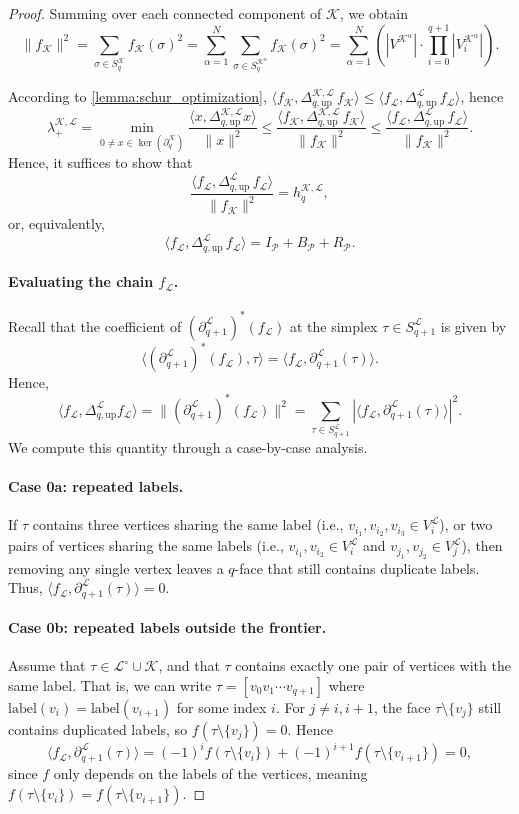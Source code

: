 \documentclass{article}
\newcommand{\KK}{\mathcal{K}}
\newcommand{\LL}{\mathcal{L}}
\begin{document}
\begin{proof}
Summing over each connected component of $\KK$, we obtain
\[
\| f_\KK\|^2=
\sum_{\sigma\in S_q^\KK}f_\KK(\sigma)^2=
\sum_{\alpha=1}^N \sum_{\sigma\in S_q^{\KK^\alpha}} f_\KK(\sigma)^2 =
\sum_{\alpha=1}^N \left(|V^{\KK^\alpha}|\cdot \prod_{i=0}^{q+1}|V^{\KK^\alpha}_i|\right).
\]

According to \cref{lemma:schur_optimization},
$\langle f_\KK, \Delta_{q, \text{up}}^{\KK, \LL}\, f_\KK \rangle \leq \langle f_\LL, \Delta_{q, \text{up}}^{\LL}\, f_\LL \rangle$,
hence
\[
\lambda_{+}^{\KK, \LL}
=
\min_{0 \neq x\in \ker(\partial_q^\KK)}\frac{\langle x, \Delta_{q, \text{up}}^{\KK, \LL}x\rangle}{\|x\|^2}\leq
\frac{\langle f_\KK, \Delta_{q, \text{up}}^{\KK, \LL}\, f_\KK \rangle}{\|f_\KK\|^2}\leq
\frac{\langle f_\LL, \Delta_{q, \text{up}}^{\LL}\, f_\LL \rangle}{\|f_\KK\|^2}.
\]
Hence, it suffices to show that
\[\frac{\langle f_\LL, \Delta_{q, \text{up}}^{\LL}\, f_\LL \rangle}{\|f_\KK\|^2}=
h_{q}^{\KK, \LL},\]
or, equivalently, 
\[
\langle f_\LL, \Delta_{q, \text{up}}^{\LL}\, f_\LL \rangle
=
I_{\mathcal{P}} + B_{\mathcal{P}} + R_{\mathcal{P}}.
\]

\paragraph{Evaluating the chain $f_\LL$.}
Recall that the coefficient of $(\partial_{q+1}^\LL)^*(f_\LL)$ at the simplex $\tau\in S^\LL_{q+1}$ is given by 
\[\langle(\partial_{q+1}^\LL)^*(f_\LL),\tau\rangle = \langle f_\LL, \partial_{q+1}^\LL(\tau)\rangle.\]
Hence, 
\[\langle f_\LL, \Delta_{q, \text{up}}^\LL f_\LL \rangle= \|(\partial_{q+1}^\LL)^*(f_\LL)\|^2 = \sum_{\tau\in S_{q+1}^\LL}|\langle f_\LL, \partial_{q+1}^\LL(\tau)\rangle|^2.\]
We compute this quantity through a case-by-case analysis.

\paragraph{Case 0a: repeated labels.}
If $\tau$ contains three vertices sharing the same label (i.e., $v_{i_1}, v_{i_2}, v_{i_3}\in V^\LL_i$), or two pairs of vertices sharing the same labels (i.e., $v_{i_1}, v_{i_2}\in V^\LL_i$ and $v_{j_1}, v_{j_2}\in V^\LL_j$), then removing any single vertex leaves a $q$-face that still contains duplicate labels. Thus, $\langle f_\LL, \partial_{q+1}^\LL(\tau)\rangle=0$.

\paragraph{Case 0b: repeated labels outside the frontier.}
Assume that $\tau\in \LL^\circ \cup \KK$, and that $\tau$ contains exactly one pair of vertices with the same label. That is, we can write $\tau = [v_0v_1\cdots v_{q+1}]$ where $\mathrm{label}(v_i) = \mathrm{label}(v_{i+1})$ for some index $i$. For $j\neq i,i+1$, the face $\tau\setminus \{v_j\}$ still contains duplicated labels, so $f(\tau \setminus \{v_j\}) = 0$. Hence
\[\langle f_\LL,\partial_{q+1}^\LL(\tau)\rangle = (-1)^i f(\tau\setminus \{v_i\}) + (-1)^{i+1} f(\tau\setminus \{v_{i+1}\}) = 0,\]
since $f$ only depends on the labels of the vertices, meaning $f(\tau \setminus \{v_i\}) = f(\tau \setminus \{v_{i+1}\})$. 


\end{proof}
\end{document}
